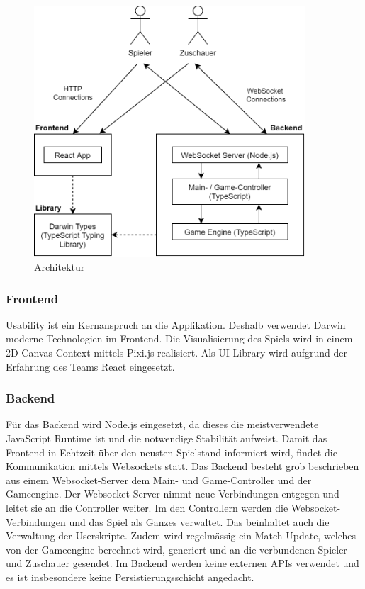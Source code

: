 \documentclass[11pt,a4paper]{scrartcl}
\begin{document}
\begin{figure}[h]
  \label{fig:architecture}
  \centering
  \includegraphics[width=0.9\textwidth]{architecture}
  \caption{Architektur}
\end{figure}

\subsubsection{Frontend}
Usability ist ein Kernanspruch an die Applikation. Deshalb verwendet Darwin moderne Technologien im Frontend.
Die Visualisierung des Spiels wird in einem 2D Canvas Context mittels Pixi.js realisiert.
Als UI-Library wird aufgrund der Erfahrung des Teams React eingesetzt.

\subsubsection{Backend}
Für das Backend wird Node.js eingesetzt, da dieses die meistverwendete JavaScript Runtime ist und die notwendige Stabilität aufweist.
Damit das Frontend in Echtzeit über den neusten Spielstand informiert wird, findet die Kommunikation mittels Websockets statt.
Das Backend besteht grob beschrieben aus einem Websocket-Server dem Main- und Game-Controller und der Gameengine.
Der Websocket-Server nimmt neue Verbindungen entgegen und leitet sie an die Controller weiter. Im den Controllern werden die Websocket-Verbindungen und das Spiel als Ganzes verwaltet. Das beinhaltet auch die Verwaltung der Userskripte.
Zudem wird regelmässig ein Match-Update, welches von der Gameengine berechnet wird, generiert und an die verbundenen Spieler und Zuschauer gesendet. 
Im Backend werden keine externen APIs verwendet und es ist insbesondere keine Persistierungsschicht angedacht.
\end{document}
